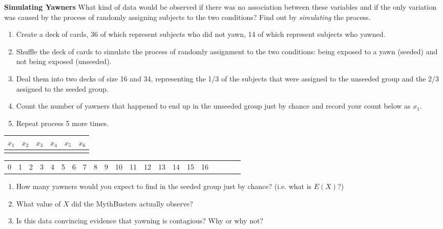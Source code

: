 \documentclass[10pt]{article}\usepackage[]{graphicx}\usepackage[]{color}
\newcommand{\ans}{\vspace{0.5in}}
\begin{document}
\textbf{Simulating Yawners} What kind of data would be observed if there was no association between these variables and if the only variation was caused by the process of randomly assigning subjects to the two conditions? Find out by \emph{simulating} the process.
\begin{enumerate}
  \item Create a deck of cards, 36 of which represent subjects who did not yawn, 14 of which represent subjects who yawned.
  \item Shuffle the deck of cards to simulate the process of randomly assignment to the two conditions: being exposed to a yawn (seeded) and not being exposed (unseeded).
  \item Deal them into two decks of size 16 and 34, representing the 1/3 of the subjects that were assigned to the unseeded group and the 2/3 assigned to the seeded group.
  \item Count the number of yawners that happened to end up in the unseeded group just by chance and record your count below as $x_1$.
  \item Repeat process 5 more times.
\end{enumerate}

\begin{center}
\begin{tabular}{|c|c|c|c|c|c|}
  \hline
  $x_1$ & $x_2$ & $x_3$ & $x_4$ & $x_5$ & $x_6$ \\
  \hline
  \hspace{0.75in} & \hspace{0.75in} & \hspace{0.75in} & \hspace{0.75in} & \hspace{0.75in} & \hspace{0.75in} \\[5ex]
  \hline
\end{tabular}
\end{center}

\vspace{2.5in}

\begin{center}
\begin{tabular}{|c|c|c|c|c|c|c|c|c|c|c|c|c|c|c|c|c|c|c|c|c|}
  \hline
  0 & 1 & 2 & 3 & 4 & 5 & 6 & 7 & 8 & 9 & 10 & 11 & 12 & 13 & 14 & 15 & 16 \\
\end{tabular}
\end{center}

\vspace{5mm}

\begin{enumerate}
  \item How many yawners would you expect to find in the seeded group just by chance? (i.e. what is $E(X)$?)
  \ans
  \item What value of $X$ did the MythBusters actually observe?
  \ans
  \item Is this data convincing evidence that yawning is contagious? Why or why not?
  \ans
\end{enumerate}
\end{document}
